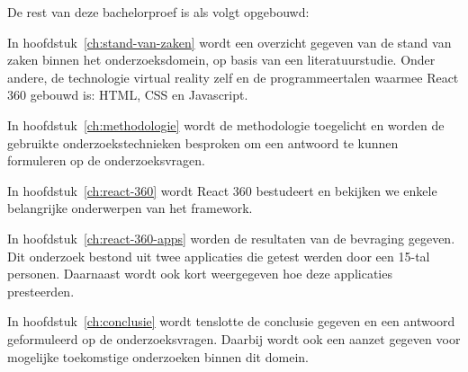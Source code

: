
De rest van deze bachelorproef is als volgt opgebouwd:

In hoofdstuk~\ref{ch:stand-van-zaken} wordt een overzicht gegeven van de stand van zaken binnen het onderzoeksdomein, op basis van een literatuurstudie. Onder andere, de technologie virtual reality zelf en de programmeertalen waarmee React 360 gebouwd is: HTML, CSS en Javascript.

In hoofdstuk~\ref{ch:methodologie} wordt de methodologie toegelicht en worden de gebruikte onderzoekstechnieken besproken om een antwoord te kunnen formuleren op de onderzoeksvragen.

In hoofdstuk~\ref{ch:react-360} wordt React 360 bestudeert en bekijken we enkele belangrijke onderwerpen van het framework.

In hoofdstuk~\ref{ch:react-360-apps} worden de resultaten van de bevraging gegeven. Dit onderzoek bestond uit twee applicaties die getest werden door een 15-tal personen. Daarnaast wordt ook kort weergegeven hoe deze applicaties presteerden.

In hoofdstuk~\ref{ch:conclusie} wordt tenslotte de conclusie gegeven en een antwoord geformuleerd op de onderzoeksvragen. Daarbij wordt ook een aanzet gegeven voor mogelijke toekomstige onderzoeken binnen dit domein.

